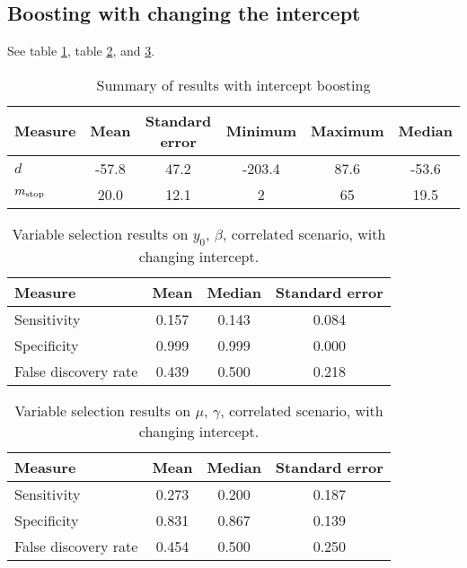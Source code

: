 \subsection{Boosting with changing the intercept}
See table \ref{table:correlated-intercept-summary}, table \ref{table:correlated-intercept-y0}, and \ref{table:correlated-intercept-mu}.
\begin{table}\caption{Summary of results with intercept boosting}\label{table:correlated-intercept-summary}
\begin{tabular}{lccccc}
Measure &    Mean &    Standard error &  Minimum & Maximum & Median \\
\hline
$d$    &    -57.8 & 47.2 &   -203.4 & 87.6 & -53.6 \\
$m_{\text{stop}}$      &    20.0 & 12.1 &     2 &    65 &  19.5 %
\end{tabular}
\end{table}

\begin{table}
\caption{Variable selection results on $y_0$, $\beta$, correlated scenario, with changing intercept.}
\label{table:correlated-intercept-y0}
\centering
\begin{tabular}{lccc}
\toprule
Measure &  Mean &  Median &  Standard error \\
\hline
Sensitivity & 0.157 &    0.143 & 0.084 \\
Specificity & 0.999 &    0.999 & 0.000 \\
False discovery rate & 0.439 & 0.500 & 0.218 \\
\bottomrule
\end{tabular}
\end{table}

\begin{table}
\caption{Variable selection results on $\mu$, $\gamma$, correlated scenario, with changing intercept.}
\label{table:correlated-intercept-mu}
\centering
\begin{tabular}{lccc}
\toprule
Measure     & Mean & Median   & Standard error     \\
\hline
Sensitivity &  0.273 &  0.200 & 0.187 \\
Specificity &  0.831 &  0.867 & 0.139 \\
False discovery rate &  0.454 &  0.500 & 0.250 \\
\bottomrule
\end{tabular}
\end{table}

